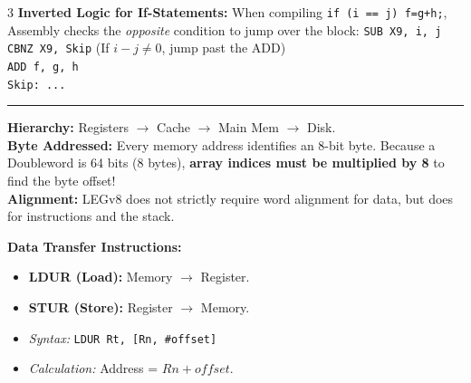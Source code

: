 \documentclass[6pt, letterpaper]{article}
\newcommand{\sectionhead}[1]{%
    \vspace{1mm}{\large\bfseries#1}\vspace{0.2mm}\hrule\vspace{0.8mm}%
}
\begin{document}
\begin{multicols}{3}
\textbf{Inverted Logic for If-Statements:}
When compiling \texttt{if (i == j) f=g+h;}, Assembly checks the \textit{opposite} condition to jump over the block:
\texttt{SUB X9, i, j} \\
\texttt{CBNZ X9, Skip}  (If $i-j \ne 0$, jump past the ADD) \\
\texttt{ADD f, g, h} \\
\texttt{Skip: ...}

\sectionhead{Memory}
\textbf{Hierarchy:} Registers $\to$ Cache $\to$ Main Mem $\to$ Disk. \\
\textbf{Byte Addressed:} Every memory address identifies an 8-bit byte. Because a Doubleword is 64 bits (8 bytes), \textbf{array indices must be multiplied by 8} to find the byte offset! \\
\textbf{Alignment:} LEGv8 does not strictly require word alignment for data, but does for instructions and the stack.

\textbf{Data Transfer Instructions:}
\begin{itemize}
    \item \textbf{LDUR (Load):} Memory $\to$ Register. 
    \item \textbf{STUR (Store):} Register $\to$ Memory.
    \item \textit{Syntax:} \texttt{LDUR Rt, [Rn, \#offset]} 
    \item \textit{Calculation:} Address = $Rn + offset$.
\end{itemize}









\end{multicols}
\end{document}
